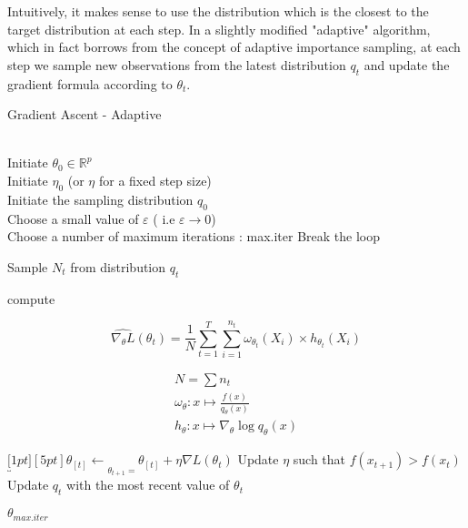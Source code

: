 Intuitively, it makes sense to use the distribution which is the closest to the target distribution at each step. In a slightly modified "adaptive" algorithm, which in fact borrows from the concept of adaptive importance sampling, at each step we sample new observations from the latest distribution $q_t$ and update the gradient formula according to $\theta_t$. 



\begin{algorithm}[H]
    \caption{Gradient Ascent - Adaptive}\label{alg:gaAdaptive}
    \begin{algorithmic}
        \Require 
        \\ \ra Initiate $\theta_0 \in \mathbb R^p$ 
        \\ \ra Initiate $\eta_0$ (or $\eta$ for a fixed step size) 
        \\ \ra Initiate the sampling distribution $q_0$
        \\ \ra Choose a small value of $\varepsilon$ ( i.e $\varepsilon \rightarrow 0 $)
        \\ \ra Choose a number of maximum iterations : max.iter
        \State Break the loop
        \EndIf

            \smallskip

            \State \ra Sample $N_t$ from distribution $q_t$ 
            
            \bigskip
            
            \State \ra compute 
            
            $$\widehat{\nabla_\theta L}(\theta_t) = \frac 1 N \displaystyle \sum\limits_{t = 1}^{T} \sum_{i = 1}^{n_t} \omega_{\theta_t}(X_i) \times h_{\theta_t}(X_i)$$ 
            

            $$\begin{array}{l}
                {N = \sum n_t}
                \\
                {\omega_\theta : x \mapsto \frac{f(x)}{q_\theta(x)}}
                \\
                {h_\theta : x \mapsto \nabla_\theta \log q_\theta(x)}
            \end{array}$$
            
            \bigskip

            \State \ra $\underbracket[1pt][5pt]{\theta_{[t]} \gets}_{\theta_{t+1} = } \theta_{[t]} + \eta \nabla L(\theta_t)$
            \State \ra Update $\eta$ such that $f(x_{t+1}) > f(x_t)$ 
            \State \ra Update $q_t$ with the most recent value of $\theta_t$
        \EndFor  
    
    \Return $\theta_{max.iter}$
    \end{algorithmic}
    \end{algorithm}

